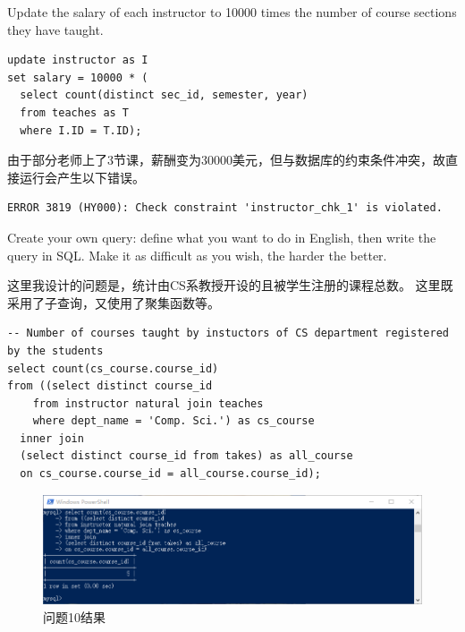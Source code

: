 \documentclass[logo,reportComp]{thesis}
\begin{document}
\begin{question}
\normalfont 
Update the salary of each instructor to 10000 times the number of course sections they have taught.
\end{question}
\begin{answer}\mbox{}\par
\begin{lstlisting}
update instructor as I
set salary = 10000 * (
  select count(distinct sec_id, semester, year)
  from teaches as T
  where I.ID = T.ID);
\end{lstlisting}
由于部分老师上了3节课，薪酬变为30000美元，但与数据库的约束条件冲突，故直接运行会产生以下错误。
\begin{lstlisting}
ERROR 3819 (HY000): Check constraint 'instructor_chk_1' is violated.
\end{lstlisting}
\end{answer}

\begin{question}
\normalfont 
Create your own query: define what you want to do in English, then write the query in SQL. Make it as difficult as you wish, the harder the better.
\end{question}
\begin{answer}
这里我设计的问题是，统计由CS系教授开设的且被学生注册的课程总数。
这里既采用了子查询，又使用了聚集函数等。
\begin{lstlisting}
-- Number of courses taught by instuctors of CS department registered by the students
select count(cs_course.course_id)
from ((select distinct course_id
    from instructor natural join teaches
    where dept_name = 'Comp. Sci.') as cs_course
  inner join
  (select distinct course_id from takes) as all_course
  on cs_course.course_id = all_course.course_id);
\end{lstlisting}
\begin{figure}[H]
\centering
\includegraphics[width=\linewidth]{fig/Q10.png}
\caption{问题10结果}
\end{figure}
\end{answer}
\end{document}
